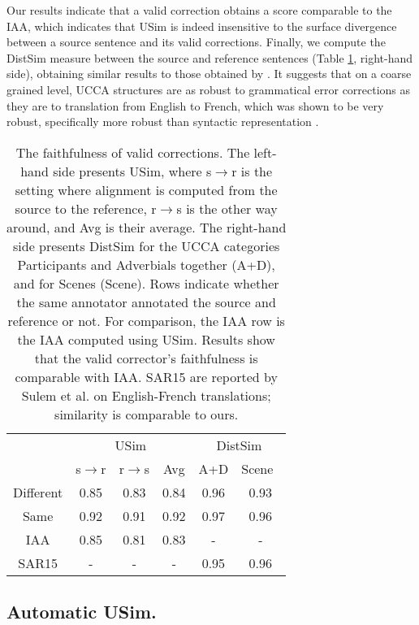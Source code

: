 \documentclass[a4paper, 11pt]{article}
\begin{document}
Our results indicate that a valid correction obtains a score comparable
to the IAA, which indicates that {\sc USim} is indeed
insensitive to the surface divergence between a source sentence and its valid corrections.
Finally, we compute the {\sc DistSim} measure
between the source and reference sentences (Table \ref{tab:Distances}, right-hand side),
obtaining similar results to those obtained by . It suggests that on a coarse grained level, UCCA structures are as robust to grammatical error corrections as they are to translation from English to French, which was shown to be very robust, specifically more robust than syntactic representation \cite{sulem2015conceptual}.
\begin{table}
	\small
	\centering
	\singlespacing
	\begin{tabular}{c|c|c|c||c|c|}
		\cline{2-6} 
		& \multicolumn{3}{c||}{\sc USim} & \multicolumn{2}{c|}{\sc DistSim}\\ \cline{2-6}
		& s$\rightarrow$r & r$\rightarrow$s & Avg & A+D & Scene\
		\\
		\hline
		Different & 0.85 & 0.83 & 0.84 & 0.96 & 0.93
		\\
		Same & 0.92 & 0.91 & 0.92 & 0.97 & 0.96
		\\
		\hline
		\hline
		IAA & 0.85 & 0.81 & 0.83 & - & -
		\\
		\hline
		SAR15 & - & - & - & 0.95 & 0.96 \\
		\hline
	\end{tabular}
	\caption{\label{tab:Distances}
		The faithfulness of valid corrections.
		The left-hand side presents {\sc USim},
		where s$\rightarrow$r is the setting where alignment is computed from the source to the reference,
		r$\rightarrow$s is the other way around, and Avg is their average.
		The right-hand side presents {\sc DistSim} for the UCCA categories Participants and Adverbials
		together (A+D), and for Scenes (Scene).
		Rows indicate whether the same annotator annotated the source and reference or not.
		For comparison, the IAA row is the IAA computed using {\sc USim}.
		Results show that the valid corrector's faithfulness is comparable with IAA.
		SAR15 are reported by Sulem et al. on English-French
		translations; similarity is comparable to ours.}
\end{table}

\subsection{Automatic {\sc USim}.}\label{subsec:automatic}
\end{document}
